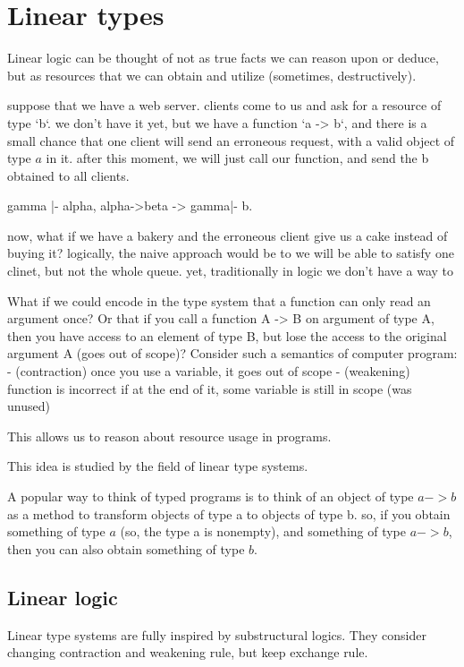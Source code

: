 \chapter{Linear types}
\label{chap:linear-types}

Linear logic can be thought of not as true facts we can reason upon or deduce,
but as resources that we can obtain and utilize (sometimes, destructively).


suppose that we have a web server. clients come to us and ask for a resource of type `b`.
we don't have it yet, but we have a function `a -> b`, and there is a small chance that
one client will send an erroneous request, with a valid object of type $a$ in it.
after this moment, we will just call our function, and send the b obtained to all clients.

gamma |- alpha, alpha->beta -> gamma|- b.

now, what if we have a bakery and the erroneous client give us a cake instead of buying it?
logically, the naive approach would be to 
we will be able to satisfy one clinet, but not the whole queue. yet, traditionally in logic we
don't have a way to 


What if we could encode in the type system that a function can only read an argument once?
Or that if you call a function A -> B on argument of type A, then you have access to an element
of type B, but lose the access to the original argument A (goes out of scope)?
Consider such a semantics of computer program:
- (contraction) once you use a variable, it goes out of scope
- (weakening) function is incorrect if at the end of it, some variable is still in scope (was unused)

This allows us to reason about resource usage in programs.

This idea is studied by the field of linear type systems.


A popular way to think of typed programs is to
think of an object of type $a -> b$ as a method to 
transform objects of type a to objects of type b.
so, if you obtain something of type $a$ (so, the type a is nonempty),
and something of type $a -> b$, then you can also obtain something of type $b$.


\section{Linear logic}

Linear type systems are fully inspired by substructural logics.
They consider changing contraction and weakening rule, but keep exchange rule.


